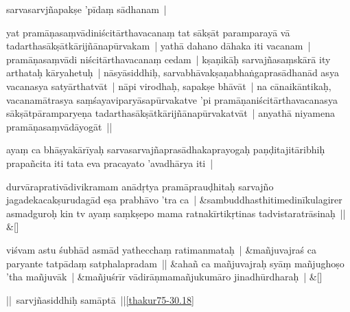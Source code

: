 \documentclass[article,12pt,a4paper]{memoir}%
\newcounter{parCount}
\begin{document}
	  
	  \pstart \leavevmode%
	sarvasarvjñapakṣe 'pīdaṃ sādhanam | 
	{}
	\pend%
      

	  
	  \pstart \leavevmode%
	yat pramāṇasaṃvādiniścitārthavacanaṃ tat sākṣāt paramparayā vā tadarthasākṣātkārijñānapūrvakam | yathā dahano dāhaka iti vacanam | pramāṇasaṃvādi niścitārthavacanaṃ cedam | kṣaṇikāḥ sarvajñasaṃskārā ity arthataḥ kāryahetuḥ | nāsyāsiddhiḥ, sarvabhāvakṣaṇabhaṅgaprasādhanād asya vacanasya satyārthatvāt | nāpi virodhaḥ, sapakṣe bhāvāt | na cānaikāntikaḥ, vacanamātrasya saṃśayaviparyāsapūrvakatve 'pi pramāṇaniścitārthavacanasya sākṣātpāramparyeṇa tadarthasākṣātkārijñānapūrvakatvāt | anyathā niyamena pramāṇasaṃvādāyogāt || 
	{}
	\pend%
      

	  
	  \pstart \leavevmode%
	\label{thakur75-31.22}ayaṃ ca bhāṣyakārīyaḥ sarvasarvajñaprasādhakaprayogaḥ paṇḍitajitāribhiḥ prapañcita iti tata eva pracayato 'avadhārya iti | 
	{}
	\pend%
      
	    
	    \stanza[\smallbreak]
	  durvāraprativādivikramam anādṛtya pramāprauḍhitaḥ sarvajño jagadekacakṣurudagād eṣa prabhāvo 'tra ca | &sambuddhasthitimedinīkulagirer asmadguroḥ kin tv ayaṃ saṃkṣepo mama ratnakīrtikṛtinas tadvistaratrāsinaḥ || \&[\smallbreak]
	  
	  
	  
	    
	    \stanza[\smallbreak]
	  viśvam astu śubhād asmād yathecchaṃ ratimanmataḥ | &mañjuvajraś ca paryante tatpādaṃ satphalapradam || &ahañ ca mañjuvajraḥ syāṃ mañjughoṣo 'tha mañjuvāk | &mañjuśrīr vādirāṇmamañjukumāro jinadhūrdharaḥ | \&[\smallbreak]
	  
	  
	  

	  
	  \pstart \leavevmode%
	|| sarvjñasiddhiḥ samāptā ||\cref{thakur75-30.18}
	{}
	\pend%
      
	    
	    \endnumbering%
	    
	  
	  
	
	    
	    \beginnumbering%
	    
\end{document}
